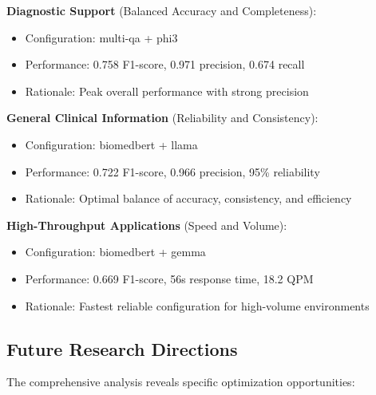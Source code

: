 \textbf{Diagnostic Support} (Balanced Accuracy and Completeness):
\begin{itemize}
    \item Configuration: multi-qa + phi3
    \item Performance: 0.758 F1-score, 0.971 precision, 0.674 recall
    \item Rationale: Peak overall performance with strong precision
\end{itemize}

\textbf{General Clinical Information} (Reliability and Consistency):
\begin{itemize}
    \item Configuration: biomedbert + llama
    \item Performance: 0.722 F1-score, 0.966 precision, 95\% reliability
    \item Rationale: Optimal balance of accuracy, consistency, and efficiency
\end{itemize}

\textbf{High-Throughput Applications} (Speed and Volume):
\begin{itemize}
    \item Configuration: biomedbert + gemma
    \item Performance: 0.669 F1-score, 56s response time, 18.2 QPM
    \item Rationale: Fastest reliable configuration for high-volume environments
\end{itemize}

\subsection{Future Research Directions}

The comprehensive analysis reveals specific optimization opportunities:

